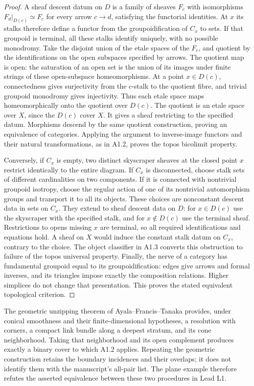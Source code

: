 \begin{proof}
A sheaf descent datum on $D$ is a family of sheaves $F_c$ with
isomorphisms $F_d|_{D(c)}\simeq F_c$ for every arrow $c\to d$, satisfying
the functorial identities. At $x$ its stalks therefore define a functor
from the groupoidification of $C_x$ to sets. If that groupoid is terminal,
all these stalks identify uniquely, with no possible monodromy.
Take the disjoint union of the etale spaces of the $F_c$, and quotient
by the identifications on the open subspaces specified by arrows. The
quotient map is open: the saturation of an open set is the union of its
images under finite strings of these open-subspace homeomorphisms.
At a point $x\in D(c)$, connectedness gives surjectivity from the
$c$-stalk to the quotient fibre, and trivial groupoid monodromy gives
injectivity. Thus each etale space maps homeomorphically onto the
quotient over $D(c)$. The quotient is an etale space over $X$, since
the $D(c)$ cover $X$. It gives a sheaf restricting to the specified
datum. Morphisms descend by the same quotient construction, proving an
equivalence of categories. Applying the argument to inverse-image
functors and their natural transformations, as in A1.2, proves the
topos bicolimit property.

Conversely, if $C_x$ is empty, two distinct skyscraper sheaves at the
closed point $x$ restrict identically to the entire diagram. If $C_x$
is disconnected, choose stalk sets of different cardinalities on two
components. If it is connected with nontrivial groupoid isotropy, choose
the regular action of one of its nontrivial automorphism groups and
transport it to all its objects. These choices are nonconstant descent
data in sets on $C_x$. They extend to sheaf descent data on $D$: for
$x\in D(c)$ use the skyscraper with the specified stalk, and for
$x\notin D(c)$ use the terminal sheaf. Restrictions to opens missing
$x$ are terminal, so all required identifications and equations hold.
A sheaf on $X$ would induce the constant stalk datum on $C_x$, contrary
to the choice. The object classifier in A1.3 converts this obstruction
to failure of the topos universal property. Finally, the nerve of a
category has fundamental groupoid equal to its groupoidification:
edges give arrows and formal inverses, and its triangles impose exactly
the composition relations. Higher simplices do not change that
presentation. This proves the stated equivalent topological criterion.
\end{proof}

The geometric unzipping theorem of Ayala--Francis--Tanaka
\cite[Theorem 7.3.8, Corollary 7.3.7 and Proposition 8.2.3]{AFT}
provides, under conical smoothness and their finite-dimensional hypotheses,
a resolution with corners, a compact link bundle along a deepest stratum,
and its cone neighborhood. Taking that neighborhood and its open complement
produces exactly a binary cover to which A1.2 applies. Repeating the
geometric construction retains the boundary incidences and their
overlaps; it does not identify them with the manuscript's all-pair list.
The plane example therefore refutes the asserted equivalence between
these two procedures in Lead L1.

